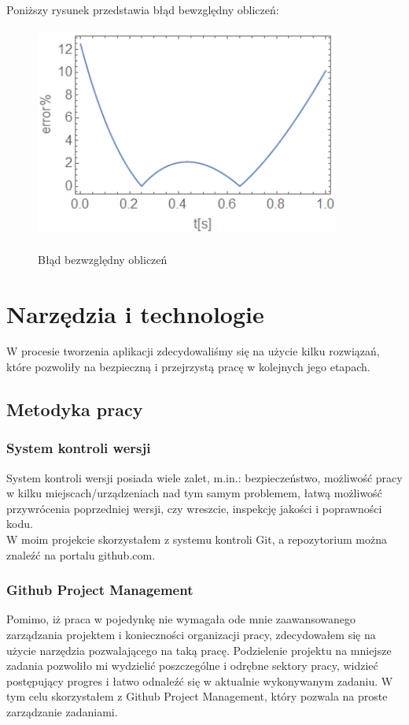 \documentclass[twoside]{projektInzynierskiMS1}
\newcommand{\si}{ś}
\begin{document}
Poniższy rysunek przedstawia błąd bewzględny obliczeń: \\

\begin{figure}[H]
\begin{center}
		\includegraphics[height=7cm, width=10cm]{5abs.png}\\
	\caption{Błąd bezwzględny obliczeń}
\end{center}
\end{figure}



\section{Narzędzia i technologie}
W procesie tworzenia aplikacji zdecydowali\si my się na użycie kilku rozwiązań, które pozwoliły na bezpieczną i przejrzystą pracę w kolejnych jego etapach. \\
	\subsection{Metodyka pracy}
	\subsubsection{System kontroli wersji}
	System kontroli wersji posiada wiele zalet, m.in.: bezpieczeństwo, możliwo\si ć pracy w kilku miejscach/urządzeniach nad tym samym problemem, łatwą możliwo\si ć przywrócenia poprzedniej wersji, czy wreszcie, inspekcję jako\si ci i poprawno\si ci kodu. \\
W moim projekcie skorzystałem z systemu kontroli Git, a repozytorium można znaleźć na portalu github.com. 
	\subsubsection{Github Project Management}
Pomimo, iż praca w pojedynkę nie wymagała ode mnie zaawansowanego zarządzania projektem i konieczno\si ci organizacji pracy, zdecydowałem się na użycie narzędzia pozwalającego na taką pracę. Podzielenie projektu na mniejsze zadania pozwoliło mi wydzielić poszczególne i odrębne sektory pracy, widzieć postępujący progres i łatwo odnaleźć się w aktualnie wykonywanym zadaniu. W tym celu skorzystałem z Github Project Management, który pozwala na proste zarządzanie zadaniami.
\end{document}

